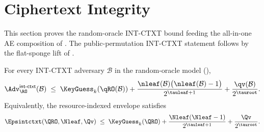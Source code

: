 \section{Ciphertext Integrity}
\label{sec:authenticity}

This section proves the random-oracle INT-CTXT bound feeding the
all-in-one AE composition of . The public-permutation
INT-CTXT statement follows by the flat-sponge lift of
.

\begin{theorem}
\label{thm:intctxt-ro}
For every INT-CTXT adversary $\mathcal{B}$ in the \TW{} random-oracle
model (),
\[
  \Adv^{\mathsf{int\text{-}ctxt}}_\RO(\mathcal{B})
  \;\leq\;
  \KeyGuess_k(\qRO(\mathcal{B}))
  + \frac{\nleaf(\mathcal{B})\bigl(\nleaf(\mathcal{B}) - 1\bigr)}{2^{\tauleaf + 1}}
  + \frac{\qv(\mathcal{B})}{2^{\tauroot}}.
\]
Equivalently, the resource-indexed envelope satisfies
\[
  \Epsintctxt(\QRO, \Nleaf, \Qv)
  \;\leq\;
  \KeyGuess_k(\QRO)
  + \frac{\Nleaf(\Nleaf - 1)}{2^{\tauleaf + 1}}
  + \frac{\Qv}{2^{\tauroot}}.
\]
\end{theorem}

